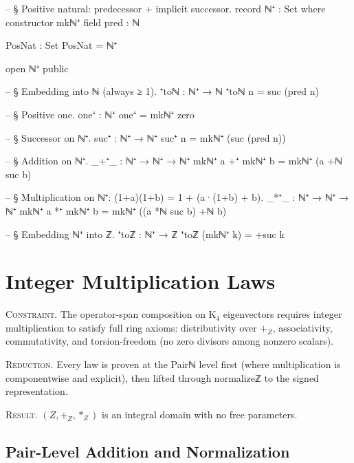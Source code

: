 \documentclass[11pt,a4paper]{book}
\def\mathbb#1{#1}%
\def\texttt#1{#1}%
\begin{document}
\begin{code}
-- § Positive natural: predecessor + implicit successor.
record ℕ⁺ : Set where
  constructor mkℕ⁺
  field
    pred : ℕ

PosNat : Set
PosNat = ℕ⁺

open ℕ⁺ public

-- § Embedding into ℕ (always ≥ 1).
⁺toℕ : ℕ⁺ → ℕ
⁺toℕ n = suc (pred n)

-- § Positive one.
one⁺ : ℕ⁺
one⁺ = mkℕ⁺ zero

-- § Successor on ℕ⁺.
suc⁺ : ℕ⁺ → ℕ⁺
suc⁺ n = mkℕ⁺ (suc (pred n))

-- § Addition on ℕ⁺.
_+⁺_ : ℕ⁺ → ℕ⁺ → ℕ⁺
mkℕ⁺ a +⁺ mkℕ⁺ b = mkℕ⁺ (a +ℕ suc b)

-- § Multiplication on ℕ⁺: (1+a)(1+b) = 1 + (a·(1+b) + b).
_*⁺_ : ℕ⁺ → ℕ⁺ → ℕ⁺
mkℕ⁺ a *⁺ mkℕ⁺ b = mkℕ⁺ ((a *ℕ suc b) +ℕ b)

-- § Embedding ℕ⁺ into ℤ.
⁺toℤ : ℕ⁺ → ℤ
⁺toℤ (mkℕ⁺ k) = +suc k
\end{code}

\chapter{Integer Multiplication Laws}

\textsc{Constraint.}
The operator-span composition on K$_4$ eigenvectors requires integer multiplication
to satisfy full ring axioms: distributivity over $+_{\mathbb{Z}}$, associativity,
commutativity, and torsion-freedom (no zero divisors among nonzero scalars).

\textsc{Reduction.}
Every law is proven at the \texttt{Pairℕ} level first (where multiplication is
componentwise and explicit), then lifted through \texttt{normalizeℤ} to the signed
representation.

\textsc{Result.}
$(\mathbb{Z}, +_{\mathbb{Z}}, *_{\mathbb{Z}})$ is an integral domain with no free
parameters.

\section{Pair-Level Addition and Normalization}
\end{document}
